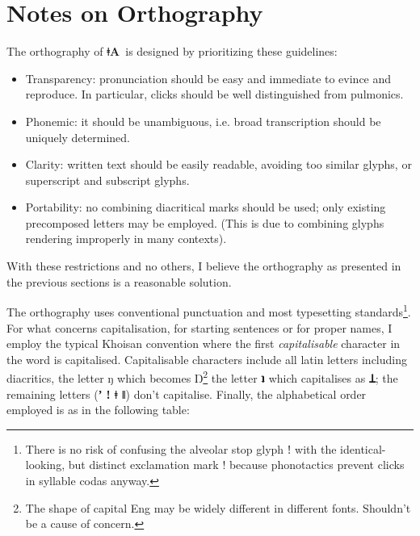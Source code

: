 \documentclass[11pt]{book}
\newcommand{\qcn}[1]{\textbf{#1}}
\newcommand{\langname}{\qcn{ǂA}~}
\begin{document}
\section{Notes on Orthography}

The orthography of \langname is designed by prioritizing these guidelines:

\begin{itemize}
	\item Transparency: pronunciation should be easy and immediate to evince and reproduce. In particular, clicks should be well distinguished from pulmonics.
	\item Phonemic: it should be unambiguous, i.e. broad transcription should be uniquely determined.
	\item Clarity: written text should be easily readable, avoiding too similar glyphs, or superscript and subscript glyphs.
	\item Portability: no combining diacritical marks should be used; only existing precomposed letters may be employed. (This is due to combining glyphs rendering improperly in many contexts). 
\end{itemize}

With these restrictions and no others, I believe the orthography as presented in the previous sections is a reasonable solution.

The orthography uses conventional punctuation and most typesetting standards\footnote{There is no risk of confusing the alveolar stop glyph ǃ with the identical-looking, but distinct exclamation mark ! because phonotactics prevent clicks in syllable codas anyway.}. For what concerns capitalisation, for starting sentences or for proper names, I employ the typical Khoisan convention where the first \emph{capitalisable} character in the word is capitalised. Capitalisable characters include all latin letters including diacritics, the letter ŋ which becomes Ŋ\footnote{The shape of capital Eng may be widely different in different fonts. Shouldn't be a cause of concern.} the letter \qcn{ʇ} which capitalises as \qcn{Ʇ}; the remaining letters (\qcn{ʼ ǃ ǂ ǁ}) don't capitalise. Finally, the alphabetical order employed is as in the following table:
\end{document}
